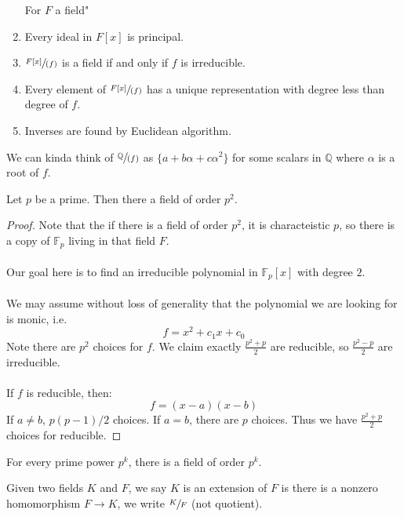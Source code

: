 \documentclass[12pt]{article}
\newenvironment{theorem}[2][Theorem]{\begin{trivlist}
    \item[\hskip \labelsep {\bfseries #1}\hskip \labelsep {\bfseries #2.}]}{\end{trivlist}}
\newenvironment{definition}[2][Definition]{\begin{trivlist}
    \item[\hskip \labelsep {\bfseries #1}\hskip \labelsep {\bfseries #2.}]}{\end{trivlist}}
\begin{document}
\begin{theorem}{:)}
    \begin{enumerate}[label=(\alph*)]
        For $F$ a field"
        \item Every ideal in $F[x]$ is principal. 
        \item $\sfrac{F[x]}{(f)}$ is a field if and only if $f$ is irreducible. 
        \item Every element of $\sfrac{F[x]}{(f)}$ has a unique representation with degree less than degree of $f$. 
        \item Inverses are found by Euclidean algorithm.
    \end{enumerate}
\end{theorem}

We can kinda think of $\sfrac{\mathbb{Q}}{(f)}$ as $\{a + b\alpha + c\alpha^2\}$ for some scalars in $\mathbb{Q}$ where $\alpha$ is a root of $f$.

\begin{theorem}{:)}
    Let $p$ be a prime. Then there a field of order $p^2$. 
    \begin{proof}
        Note that the if there is a field of order $p^2$, it is characteistic $p$, so there is a copy of $\mathbb{F}_p$ living in that field $F$. \\ \\
        Our goal here is to find an irreducible polynomial in $\mathbb{F}_p[x]$ with degree $2$. \\ \\
        We may assume without loss of generality that the polynomial we are looking for is monic, i.e.
        $$f = x^2 + c_1x + c_0$$
        Note there are $p^2$ choices for $f$. We claim exactly $\frac{p^2 + p}{2}$ are reducible, so $\frac{p^2 - p}{2}$ are irreducible. \\ \\
        If $f$ is reducible, then:
        $$f = (x - a)(x - b)$$
        If $a \neq b$, $p(p - 1)/2$ choices. If $a = b$, there are $p$ choices. Thus we have $\frac{p^2 + p}{2}$ choices for reducible.
    \end{proof}
\end{theorem}

\begin{theorem}{:)}
    For every prime power $p^k$, there is a field of order $p^k$. 
\end{theorem}

\begin{definition}{(Field Extension)}
    Given two fields $K$ and $F$, we say $K$ is an extension of $F$ is there is a nonzero homomorphism $F \rightarrow K$, we write $\sfrac{K}{F}$ (not quotient).
\end{definition}
\end{document}
